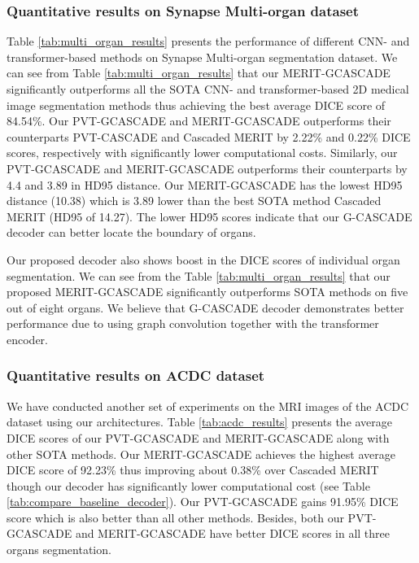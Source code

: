 \documentclass[10pt,twocolumn,letterpaper]{article}
\begin{document}
\subsubsection{Quantitative results on Synapse Multi-organ dataset}
Table \ref{tab:multi_organ_results} presents the performance of different CNN- and transformer-based methods on Synapse Multi-organ segmentation dataset. We can see from Table \ref{tab:multi_organ_results} that our MERIT-GCASCADE significantly outperforms all the SOTA CNN- and transformer-based 2D medical image segmentation methods thus achieving the best average DICE score of 84.54\%. Our PVT-GCASCADE and MERIT-GCASCADE outperforms their counterparts PVT-CASCADE and Cascaded MERIT by 2.22\% and 0.22\% DICE scores, respectively with significantly lower computational costs. Similarly, our PVT-GCASCADE and MERIT-GCASCADE outperforms their counterparts by 4.4 and 3.89 in HD95 distance. Our MERIT-GCASCADE has the lowest HD95 distance (10.38) which is 3.89 lower than the best SOTA method Cascaded MERIT (HD95 of 14.27). The lower HD95 scores indicate that our G-CASCADE decoder can better locate the boundary of organs.

Our proposed decoder also shows boost in the DICE scores of individual organ segmentation. We can see from the Table \ref{tab:multi_organ_results} that our proposed MERIT-GCASCADE significantly outperforms SOTA methods on five out of eight organs. We believe that G-CASCADE decoder demonstrates better performance due to using graph convolution together with the transformer encoder.


\subsubsection{Quantitative results on ACDC dataset}
We have conducted another set of experiments on the MRI images of the ACDC dataset using our architectures. Table \ref{tab:acdc_results}
presents the average DICE scores of our PVT-GCASCADE and MERIT-GCASCADE along with other SOTA methods. Our MERIT-GCASCADE achieves the highest average DICE score of 92.23\% thus improving about 0.38\% over Cascaded MERIT though our decoder has significantly lower computational cost (see Table \ref{tab:compare_baseline_decoder}). Our PVT-GCASCADE gains 91.95\% DICE score which is also better than all other methods. Besides, both our PVT-GCASCADE and MERIT-GCASCADE have better DICE scores in all three organs segmentation. 
\end{document}
